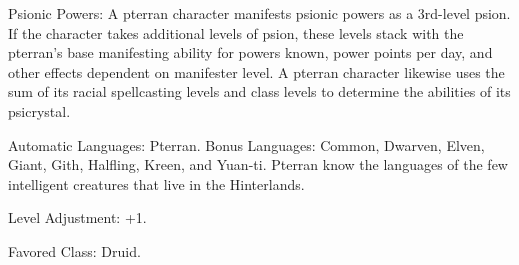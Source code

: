 \begin{itemize*}
    \item Psionic Powers: A pterran character manifests psionic powers as a 3rd-level psion. If the character takes additional levels of psion, these levels stack with the pterran's base manifesting ability for powers known, power points per day, and other effects dependent on manifester level. A pterran character likewise uses the sum of its racial spellcasting levels and class levels to determine the abilities of its psicrystal.

    \item Automatic Languages: Pterran. Bonus Languages: Common, Dwarven, Elven, Giant, Gith, Halfling, Kreen, and Yuan-ti. Pterran know the languages of the few intelligent creatures that live in the Hinterlands.
    \item Level Adjustment: +1.
    \item Favored Class: Druid.
\end{itemize*}